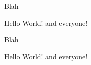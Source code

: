 \documentclass{exam}
\begin{document}
\begin{questions}

\question
Blah
\begin{randomizechoices}
\choice Hello
\choice World!
\CorrectChoice and
\choice everyone!
\end{randomizechoices}

\question
Blah
\begin{randomizechoices}
\choice Hello
\choice World!
\correctchoice and
\choice everyone!
\end{randomizechoices}

\end{questions}
\end{document}
